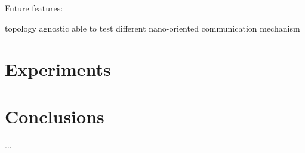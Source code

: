 \documentclass[conference]{IEEEtran}
\begin{document}
Future features:

topology agnostic able to test different nano-oriented communication
mechanism


\section{Experiments}



\section{Conclusions}
...


\balance

 


\end{document}
